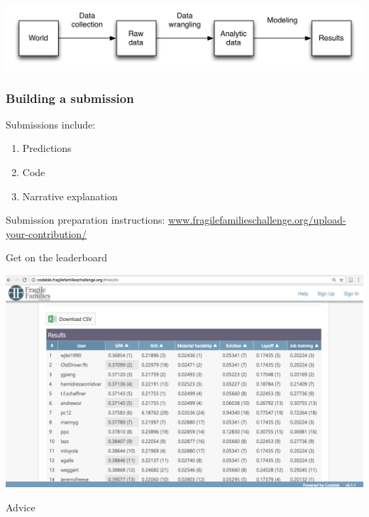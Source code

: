 \documentclass{beamer}
\begin{document}
\begin{frame}

\begin{center}
\includegraphics[width=\textwidth]{figures/scientific_pipeline}
\end{center}

\end{frame}
\begin{frame}
\frametitle{Building a submission}

Submissions include:
\begin{enumerate}
\item Predictions
\item Code
\item Narrative explanation
\end{enumerate}

\vfill
Submission preparation instructions: \textcolor{blue}{\href{http://www.fragilefamilieschallenge.org/upload-your-contribution/}{www.fragilefamilieschallenge.org/upload-your-contribution/}}

\end{frame}
\begin{frame}{Get on the leaderboard}

\includegraphics[width = \textwidth]{figures/leaderboard}

\end{frame}
\begin{frame}

\begin{center}
\LARGE{Advice}
\end{center}

\end{frame}
\end{document}
